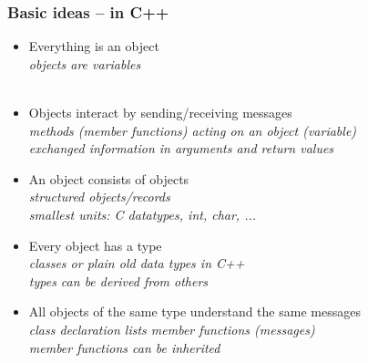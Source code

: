 \documentclass{slides}
\begin{document}
\begin{frame}
  \frametitle{Basic ideas -- in C++}

  \begin{itemize}
  \item \alert{Everything is an object}\\
    \emph{objects are variables}\\
		~
  \item \alert{Objects interact by sending/receiving messages}\\
    \emph{methods (member functions) acting on an object (variable)}\\
    \emph{exchanged information in arguments and return values}
  \item \alert{An object consists of objects}\\
    \emph{structured objects/records}\\
    \emph{smallest units: C datatypes, int, char, ...}\\
  \item \alert{Every object has a type}\\
    \emph{classes or plain old data types in C++}\\
    \emph{types can be derived from others }
  \item \alert{All objects of the same type understand the same messages}\\
    \emph{class declaration lists member functions (messages)}\\
    \emph{member functions can be inherited}
  \end{itemize}
\end{frame}
\end{document}

